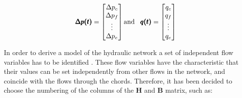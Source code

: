 
\begin{equation}
\pmb{\Delta p(t)} =
\begin{bmatrix}
         \Delta p_c \\
	\Delta p_f \\ 
	\vdots \\
	\Delta p_e \\
\end{bmatrix}
\text{and}\hspace{0.3cm}
\pmb{q(t)} =
\begin{bmatrix}
         q_c \\
	q_f \\ 
	\vdots \\
	q_e \\
\end{bmatrix}
\end{equation}


In order to derive a model of the hydraulic network a set of independent flow variables has to be identified \cite{TowerModel}. These flow variables have the characteristic 
that their values can be set independently from other flows in the network, and coincide with the flows through the chords. 
Therefore, it has been decided to choose the numbering of the columns of the 
$\pmb{H}$ and $\pmb{B}$ matrix, such as:



